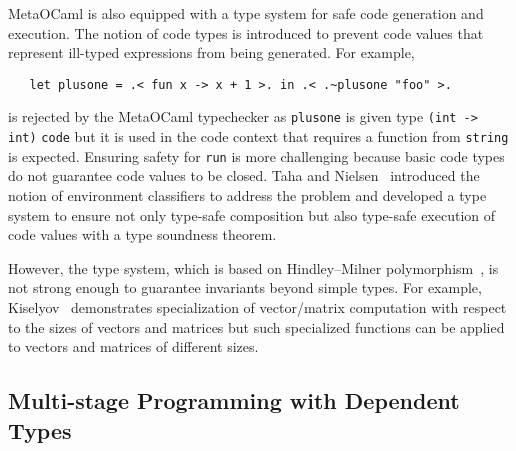 
MetaOCaml is also equipped with a type system for safe code generation
and execution.  The notion of code types is introduced to prevent code
values that represent ill-typed expressions from being generated.  For
example,
\begin{verbatim}
   let plusone = .< fun x -> x + 1 >. in .< .~plusone "foo" >.
\end{verbatim}
is rejected by the MetaOCaml typechecker as \verb|plusone| is given
type \verb|(int -> int)| \verb|code| but it is used in the code context that
requires a function from \verb|string| is expected.  Ensuring safety
for \verb|run| is more challenging because basic code types do not
guarantee code values to be closed.  Taha and
Nielsen~\cite{taha2003environment} introduced the notion of
environment classifiers to address the problem and developed a type
system to ensure not only type-safe composition but also type-safe
execution of code values with a type soundness theorem.

However, the type system, which is based on Hindley--Milner
polymorphism~\cite{}, is not strong enough to guarantee invariants
beyond simple types.  For example, Kiselyov~\cite{} demonstrates
specialization of vector/matrix computation with respect to the sizes
of vectors and matrices but such specialized functions can be applied
to vectors and matrices of different sizes.




\subsection{Multi-stage Programming with Dependent Types}

